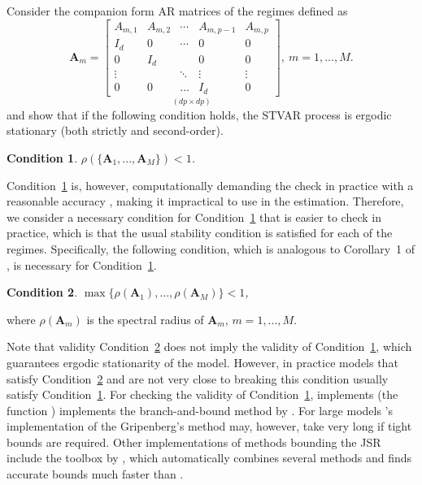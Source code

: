 \documentclass[nojss]{jss}
\newtheorem{condition}{Condition}
\begin{document}
Consider the companion form AR matrices of the regimes defined as
\begin{equation}\label{eq:boldA}
\boldsymbol{A}_m =
\underset{(dp\times dp)}{\begin{bmatrix}
A_{m,1} & A_{m,2} & \cdots & A_{m,p-1} & A_{m,p} \\
I_d  & 0     & \cdots & 0            & 0 \\
0     & I_d  &             & 0            & 0 \\
\vdots &   & \ddots & \vdots    & \vdots \\
0     & 0     & \hdots & I_d         & 0
\end{bmatrix}}, \
m=1,...,M.
\end{equation}
\citet[][Theorem 1]{Kheifets+Saikkonen:2020} and \cite{Lanne+Virolainen:2024} \citep[see also][]{Saikkonen:2008} show that if the following condition holds, the STVAR process is ergodic stationary (both strictly and second-order).
\begin{condition}\label{cond:sufficient}
$\rho(\lbrace \boldsymbol{A}_1,...,\boldsymbol{A}_M \rbrace) < 1$.
\end{condition}

Condition~\ref{cond:sufficient} is, however, computationally demanding the check in practice with a reasonable accuracy \citep[e.g.,][]{Chang+Blondel:2013}, making it impractical to use in the estimation. Therefore, we consider a necessary condition for Condition~\ref{cond:sufficient} that is easier to check in practice, which is that the usual stability condition is satisfied for each of the regimes. Specifically, the following condition, which is analogous to Corollary~1 of \cite{Kheifets+Saikkonen:2020}, is necessary for Condition~\ref{cond:sufficient}.
\begin{condition}\label{cond:necessary}
$\max\lbrace \rho(\boldsymbol{A}_1),...,\rho(\boldsymbol{A}_M)\rbrace<1$,
\end{condition}
where $\rho(\boldsymbol{A}_m)$ is the spectral radius of $\boldsymbol{A}_m$, $m=1,...,M$.

Note that validity Condition~\ref{cond:necessary} does not imply the validity of Condition~\ref{cond:sufficient}, which guarantees ergodic stationarity of the model. However, in practice models that satisfy Condition~\ref{cond:necessary} and are not very close to breaking this condition usually satisfy Condition~\ref{cond:sufficient}. For checking the validity of Condition~\ref{cond:sufficient},  implements (the function ) implements the branch-and-bound method by \cite{Gripenberg:1996}. For large models 's implementation of the Gripenberg's method may, however, take very long if tight bounds are required. Other implementations of methods bounding the JSR include the  toolbox  by \cite{Jungers:2023}, which automatically combines several methods and finds accurate bounds much faster than .
\end{document}
